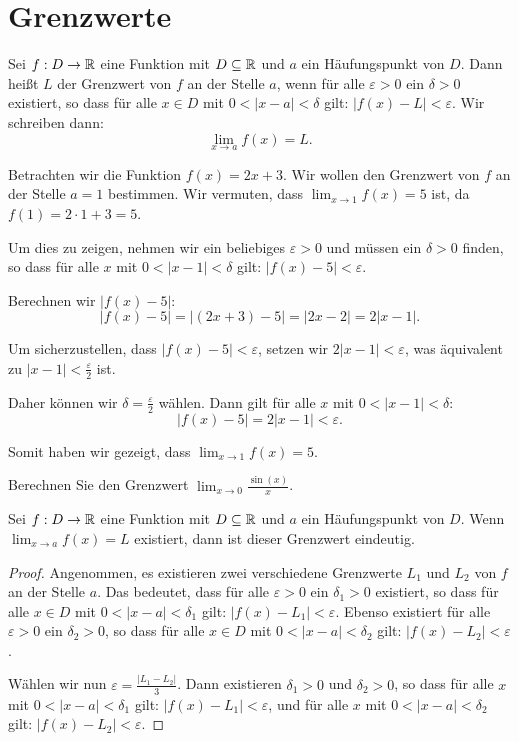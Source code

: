 \chapter{Grenzwerte}

\begin{definition}[Grenzwert]
  Sei $f: D \to \mathbb{R}$ eine Funktion mit $D \subseteq \mathbb{R}$ und $a$ ein Häufungspunkt von $D$. Dann heißt $L$ der Grenzwert von $f$ an der Stelle $a$, wenn für alle $\varepsilon > 0$ ein $\delta > 0$ existiert, so dass für alle $x \in D$ mit $0 < |x - a| < \delta$ gilt: $|f(x) - L| < \varepsilon$. Wir schreiben dann:
  \[
    \lim_{x \to a} f(x) = L.
  \]
\end{definition}

\begin{example}
  Betrachten wir die Funktion $f(x) = 2x + 3$. Wir wollen den Grenzwert von $f$ an der Stelle $a = 1$ bestimmen. Wir vermuten, dass $\lim_{x \to 1} f(x) = 5$ ist, da $f(1) = 2 \cdot 1 + 3 = 5$.

  Um dies zu zeigen, nehmen wir ein beliebiges $\varepsilon > 0$ und müssen ein $\delta > 0$ finden, so dass für alle $x$ mit $0 < |x - 1| < \delta$ gilt: $|f(x) - 5| < \varepsilon$.

  Berechnen wir $|f(x) - 5|$:
  \[
    |f(x) - 5| = |(2x + 3) - 5| = |2x - 2| = 2|x - 1|.
  \]

  Um sicherzustellen, dass $|f(x) - 5| < \varepsilon$, setzen wir $2|x - 1| < \varepsilon$, was äquivalent zu $|x - 1| < \frac{\varepsilon}{2}$ ist.

  Daher können wir $\delta = \frac{\varepsilon}{2}$ wählen. Dann gilt für alle $x$ mit $0 < |x - 1| < \delta$:
  \[
    |f(x) - 5| = 2|x - 1| < \varepsilon.
  \]

  Somit haben wir gezeigt, dass $\lim_{x \to 1} f(x) = 5$.
\end{example}

\begin{exercise}
  Berechnen Sie den Grenzwert $\lim_{x \to 0} \frac{\sin(x)}{x}$.
\end{exercise}

\begin{proposition}
  Sei $f: D \to \mathbb{R}$ eine Funktion mit $D \subseteq \mathbb{R}$ und $a$ ein Häufungspunkt von $D$. Wenn $\lim_{x \to a} f(x) = L$ existiert, dann ist dieser Grenzwert eindeutig.
\end{proposition}

\begin{proof}
  Angenommen, es existieren zwei verschiedene Grenzwerte $L_1$ und $L_2$ von $f$ an der Stelle $a$. Das bedeutet, dass für alle $\varepsilon > 0$ ein $\delta_1 > 0$ existiert, so dass für alle $x \in D$ mit $0 < |x - a| < \delta_1$ gilt: $|f(x) - L_1| < \varepsilon$. Ebenso existiert für alle $\varepsilon > 0$ ein $\delta_2 > 0$, so dass für alle $x \in D$ mit $0 < |x - a| < \delta_2$ gilt: $|f(x) - L_2| < \varepsilon$.

  Wählen wir nun $\varepsilon = \frac{|L_1 - L_2|}{3}$. Dann existieren $\delta_1 > 0$ und $\delta_2 > 0$, so dass für alle $x$ mit $0 < |x - a| < \delta_1$ gilt: $|f(x) - L_1| < \varepsilon$, und für alle $x$ mit $0 < |x - a| < \delta_2$ gilt: $|f(x) - L_2| < \varepsilon$.
\end{proof}

